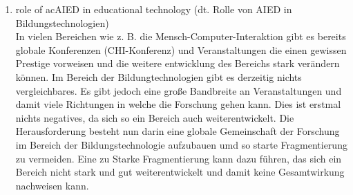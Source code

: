 \begin{enumerate}
    
    \item role of ac{AIED} in educational technology (dt. Rolle von \ac{AIED} in Bildungstechnologien) \\
    In vielen Bereichen wie z. B. die Mensch-Computer-Interaktion gibt es bereits globale Konferenzen (CHI-Konferenz) und Veranstaltungen die einen gewissen Prestige vorweisen und die weitere entwicklung des Bereichs stark verändern können.
    Im Bereich der Bildungtechnologien gibt es derzeitig nichts vergleichbares. Es gibt jedoch eine große Bandbreite an Veranstaltungen und damit viele Richtungen in welche die Forschung gehen kann. Dies ist erstmal nichts negatives, da sich so ein Bereich auch weiterentwickelt.
    Die Herausforderung besteht nun darin eine globale Gemeinschaft der Forschung im Bereich der Bildungstechnologie aufzubauen umd so starte Fragmentierung zu vermeiden.
    Eine zu Starke Fragmentierung kann dazu führen, das sich ein Bereich nicht stark und gut weiterentwickelt und damit keine Gesamtwirkung nachweisen kann. 
\end{enumerate} 



